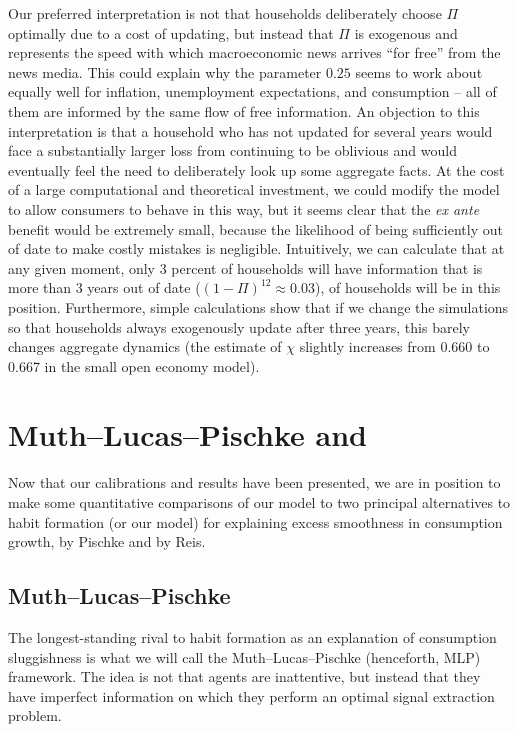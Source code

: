 \documentclass[titlepage]{./econtex}
\begin{document}
Our preferred interpretation is not that households deliberately choose $\Pi$ optimally due to a cost of updating, but instead that $\Pi$ is exogenous and represents the speed with which macroeconomic news arrives ``for free'' from the news media.  This could explain why the parameter $0.25$ seems to work about equally well for inflation, unemployment expectations, and consumption -- all of them are informed by the same flow of free information. An objection to this interpretation is that a household who has not updated for several years would face a substantially larger loss from continuing to be oblivious and would eventually feel the need to deliberately look up some aggregate facts.  At the cost of a large computational and theoretical investment, we could modify the model to allow consumers to behave in this way, but it seems clear that the {\it ex ante} benefit would be extremely small, because the likelihood of being sufficiently out of date to make costly mistakes is negligible.  Intuitively, we can calculate that at any given moment, only 3 percent of households will have information that is more than 3 years out of date ($(1-\Pi)^{12} \approx 0.03$), of households will be in this position.  Furthermore, simple calculations show that if we change the simulations so that households always exogenously update after three years, this barely changes aggregate dynamics (the estimate of $\chi$ slightly increases from 0.660 to 0.667 in the small open economy model).

\section{Muth--Lucas--Pischke and \cite{reis:inattentive}} \label{sec:Comparisons}

Now that our calibrations and results have been presented, we are in position to make some quantitative comparisons of our model to two principal alternatives to habit formation (or our model) for explaining excess smoothness in consumption growth, by Pischke and by Reis.

\subsection{Muth--Lucas--Pischke}
The longest-standing rival to habit formation as an explanation of consumption sluggishness is what we will call the Muth--Lucas--Pischke (henceforth, MLP) framework.  The idea is not that agents are inattentive, but instead that they have imperfect information on which they perform an optimal signal extraction problem.
\end{document}

